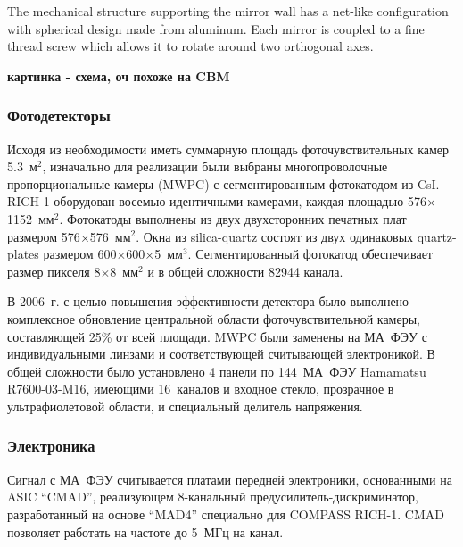 The mechanical structure supporting the mirror wall has a net-like configuration with spherical design made from aluminum. Each mirror is coupled to a fine thread screw which allows it to rotate around two orthogonal axes.

\todo \textbf{картинка - схема, оч похоже на CBM}

\subsubsection{Фотодетекторы}

Исходя из необходимости иметь суммарную площадь фоточувствительных камер 5.3~м$^2$, изначально для реализации были выбраны многопроволочные пропорциональные камеры (MWPC) с сегментированным фотокатодом из CsI. \mbox{RICH-1} оборудован восемью идентичными камерами, каждая площадью 576$\times$1152~мм$^2$. Фотокатоды выполнены из двух двухсторонних печатных плат размером 576$\times$576~мм$^2$. Окна из silica-quartz состоят из двух одинаковых quartz-plates размером 600$\times$600$\times$5~мм$^3$. Сегментированный фотокатод обеспечивает размер пикселя 8$\times$8~мм$^2$ и в общей сложности 82944 канала.


В 2006~г. с целью повышения эффективности детектора было выполнено комплексное обновление центральной области фоточувствительной камеры, составляющей 25\% от всей площади. MWPC были заменены на МА~ФЭУ с индивидуальными линзами и соответствующей считывающей электроникой. В общей сложности было установлено 4 панели по 144~МА~ФЭУ Hamamatsu R7600-03-M16, имеющими 16~каналов и входное стекло, прозрачное в ультрафиолетовой области, и специальный делитель напряжения.


\subsubsection{Электроника}

Сигнал с МА~ФЭУ считывается платами передней электроники, основанными на ASIC ``CMAD'', реализующем 8-канальный предусилитель-дискриминатор, разработанный на основе ``MAD4'' специально для COMPASS \mbox{RICH-1}. CMAD позволяет работать на частоте до 5~МГц на канал.

